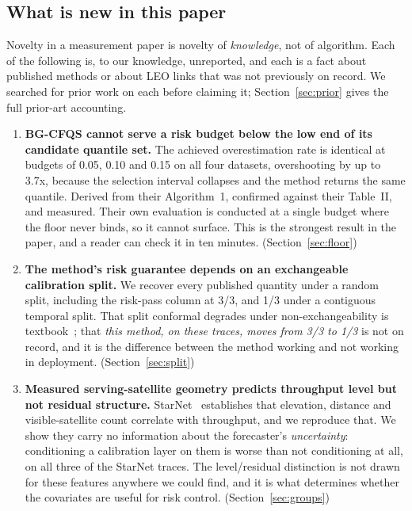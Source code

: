 \documentclass[acmsmall,screen]{acmart}
\begin{document}
\subsection{What is new in this paper}
\label{sec:new}

Novelty in a measurement paper is novelty of \emph{knowledge}, not of algorithm. Each of the following is, to our knowledge, unreported, and each is a fact about published methods or about LEO links that was not previously on record. We searched for prior work on each before claiming it; Section~\ref{sec:prior} gives the full prior-art accounting.

\begin{enumerate}
\item \textbf{BG-CFQS cannot serve a risk budget below the low end of its candidate quantile set.} The achieved overestimation rate is identical at budgets of 0.05, 0.10 and 0.15 on all four datasets, overshooting by up to 3.7x, because the selection interval collapses and the method returns the same quantile. Derived from their Algorithm~1, confirmed against their Table~II, and measured. Their own evaluation is conducted at a single budget where the floor never binds, so it cannot surface. This is the strongest result in the paper, and a reader can check it in ten minutes. (Section~\ref{sec:floor})

\item \textbf{The method's risk guarantee depends on an exchangeable calibration split.} We recover every published quantity under a random split, including the risk-pass column at 3/3, and 1/3 under a contiguous temporal split. That split conformal degrades under non-exchangeability is textbook~\cite{barber2023beyond}; that \emph{this method, on these traces, moves from 3/3 to 1/3} is not on record, and it is the difference between the method working and not working in deployment. (Section~\ref{sec:split})

\item \textbf{Measured serving-satellite geometry predicts throughput level but not residual structure.} StarNet~\cite{liu2025starnet} establishes that elevation, distance and visible-satellite count correlate with throughput, and we reproduce that. We show they carry no information about the forecaster's \emph{uncertainty}: conditioning a calibration layer on them is worse than not conditioning at all, on all three of the StarNet traces. The level/residual distinction is not drawn for these features anywhere we could find, and it is what determines whether the covariates are useful for risk control. (Section~\ref{sec:groups})


\end{enumerate}
\end{document}
